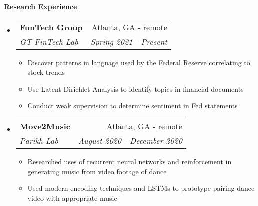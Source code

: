 \documentclass[letterpaper,10pt]{article}
\makeatletter
\newcommand{\resitem}[1]{\item #1 \vspace{-2pt}}
\newcommand{\resheading}[1]{{\large \colorbox{mygrey}{\begin{minipage}{\textwidth}{\textbf{#1 \vphantom{p\^{E}}}}\end{minipage}}}}
\newcommand{\ressubheading}[4]{
\begin{tabular*}{7.0in}{l@{\extracolsep{\fill}}r}
		\textbf{#1} & #2 \\
		\textit{#3} & \textit{#4} \\
\end{tabular*}\vspace{-6pt}}
\makeatother
\begin{document}
\resheading{Research Experience}
\begin{itemize}
\item
    \ressubheading{FunTech Group}{Atlanta, GA - remote}{GT FinTech Lab}{Spring 2021 - Present}
    \begin{itemize}
        \resitem{Discover patterns in language used by the Federal Reserve correlating to stock trends}
        \resitem{Use Latent Dirichlet Analysis to identify topics in financial documents}
        \resitem{Conduct weak supervision to determine sentiment in Fed statements}
    \end{itemize}
\item
    \ressubheading{Move2Music}{Atlanta, GA - remote}{Parikh Lab}{August 2020 - December 2020}
    \begin{itemize}
        \resitem{Researched uses of recurrent neural networks and reinforcement in generating music from video footage of dance}
        \resitem{Used modern encoding techniques and LSTMs to prototype pairing dance video with appropriate music}
    \end{itemize}

\end{itemize}
\end{document}
